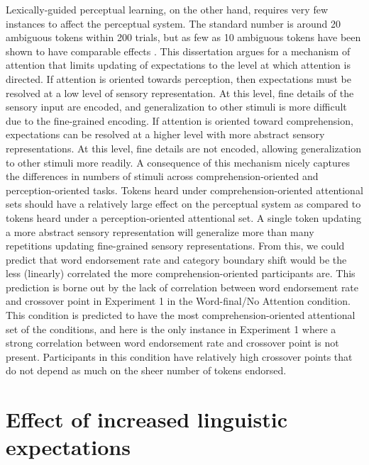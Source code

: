 Lexically-guided perceptual learning, on the other hand, requires very few instances to affect the perceptual system.
The standard number is around 20 ambiguous tokens within 200 trials, but as few as 10 ambiguous tokens have been shown to have comparable effects \citep{Kraljic2008}.
This dissertation argues for a mechanism of attention that limits updating of expectations to the level at which attention is directed.
If attention is oriented towards perception, then expectations must be resolved at a low level of sensory representation.
At this level, fine details of the sensory input are encoded, and generalization to other stimuli is more difficult due to the fine-grained encoding.
If attention is oriented toward comprehension, expectations can be resolved at a higher level with more abstract sensory representations.
At this level, fine details are not encoded, allowing generalization to other stimuli more readily.
A consequence of this mechanism nicely captures the differences in numbers of stimuli across comprehension-oriented and perception-oriented tasks.
Tokens heard under comprehension-oriented attentional sets should have a relatively large effect on the perceptual system as compared to tokens heard under a perception-oriented attentional set.
A single token updating a more abstract sensory representation will generalize more than many repetitions updating fine-grained sensory representations.
From this, we could predict that word endorsement rate and category boundary shift would be the less (linearly) correlated the more comprehension-oriented participants are.
This prediction is borne out by the lack of correlation between word endorsement rate and crossover point in Experiment 1 in the Word-final/No Attention condition.
This condition is predicted to have the most comprehension-oriented attentional set of the conditions, and here is the only instance in Experiment 1 where a strong correlation between word endorsement rate and crossover point is not present.
Participants in this condition have relatively high crossover points that do not depend as much on the sheer number of tokens endorsed.

\section{Effect of increased linguistic expectations}

